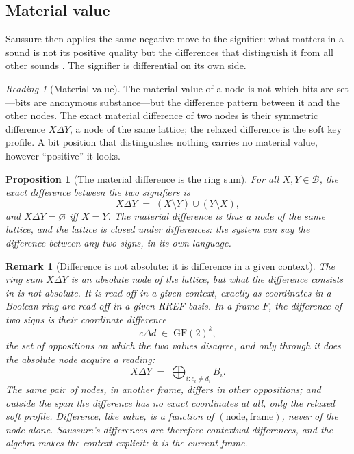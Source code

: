 \documentclass[11pt,a4paper]{article}
\newtheorem{proposition}[principle]{Proposition}
\newtheorem{remark}[principle]{Remark}
\theoremstyle{remark}
\newtheorem{reading}[principle]{Reading}
\newcommand{\Lat}{\ensuremath{\mathcal{B}}}              %
\newcommand{\xor}{\ensuremath{\Delta}}                   %
\begin{document}
\subsection{Material value}
\label{sec:material-value}

Saussure then applies the same negative move to the signifier: what matters in
a sound is not its positive quality but the differences that distinguish it
from all other sounds \cite[Part II, ch.~IV, \S3]{harris1983}. The signifier
is differential on its own side.

\begin{reading}[Material value]
\label{read:material}
The material value of a node is not which bits are set---bits are anonymous
substance---but the difference pattern between it and the other nodes. The
exact material difference of two nodes is their symmetric difference
$X \xor Y$, a node of the same lattice; the relaxed difference is the soft
key profile. A bit position that distinguishes nothing carries no material
value, however ``positive'' it looks.
\end{reading}

\begin{proposition}[The material difference is the ring sum]
\label{prop:material-difference}
For all $X,Y \in \Lat$, the exact difference between the two signifiers is
\[
  X \xor Y \;=\; (X \setminus Y) \cup (Y \setminus X),
\]
and $X \xor Y = \varnothing$ iff $X = Y$. The material difference is thus a
node of the same lattice, and the lattice is closed under differences: the
system can \emph{say} the difference between any two signs, in its own
language.
\end{proposition}

\begin{remark}[Difference is not absolute: it is difference in a given context]
\label{rem:difference-relative}
The ring sum $X \xor Y$ is an absolute node of the lattice, but \emph{what the
difference consists in} is not absolute. It is read off in a given context,
exactly as coordinates in a Boolean ring are read off in a given RREF basis.
In a frame $F$, the difference of two signs is their coordinate difference
\[
  c \xor d \;\in\; \mathrm{GF}(2)^k,
\]
the set of oppositions on which the two values disagree, and only through it
does the absolute node acquire a reading:
\[
  X \xor Y \;=\; \bigoplus_{i : c_i \neq d_i} B_i .
\]
The same pair of nodes, in another frame, differs in other oppositions; and
outside the span the difference has no exact coordinates at all, only the
relaxed soft profile. Difference, like value, is a function of
$(\text{node}, \text{frame})$, never of the node alone. Saussure's differences
are therefore \emph{contextual} differences, and the algebra makes the context
explicit: it is the current frame.
\end{remark}
\end{document}

